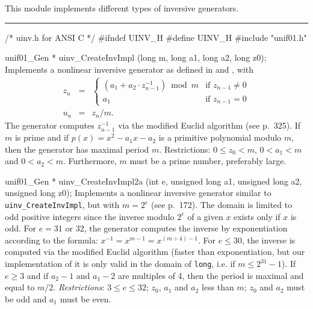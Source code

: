
This module implements different types of inversive generators.

\bigskip
\hrule
\code
\hide
/* uinv.h for ANSI C */
#ifndef UINV_H
#define UINV_H
\endhide
#include "unif01.h"


unif01_Gen * uinv_CreateInvImpl (long m, long a1, long a2, long z0);
\endcode
  \tab Implements a nonlinear inversive generator as 
   defined in \cite{rEIC92c} and \cite[p.93]{rLEC90a}, with
  \begin{eqnarray*}
         z_n &=& \left\{ \begin{array}{ll}
      (a_1 + a_2\cdot z_{n-1}^{-1})\bmod m & \mbox{if $z_{n-1}\not=0$}\\[6pt] 
       a_1                                       & \mbox{if $z_{n-1} = 0$} 
    \end{array} \right.\\
   u_n &=& z_n / m.
  \end{eqnarray*}
   The generator computes $z_{n-1}^{-1}$ via the modified
%
   Euclid algorithm (see \cite{rKNU81a} p.~325).  
   If $m$ is prime and if $p(x) = x^2 - a_1 x - a_2$ is a
   primitive polynomial modulo $m$, then the generator has 
    maximal  period $m$.
   Restrictions: $0 \le z_0 < m$,
   $0 < a_1 < m$ and $0 < a_2 < m$.  Furthermore, $m$ must be a prime
   number, preferably large. %
  \endtab
\code


unif01_Gen * uinv_CreateInvImpl2a (int e, unsigned long a1,
                                   unsigned long a2, unsigned long z0);
\endcode
  \tab Implements a nonlinear inversive generator similar to
    {\tt uinv\_CreateInvImpl}, but with $m = 2^e$ 
   (see \cite{rEIC92c} p.~172). 
   The  domain is limited to odd positive integers since 
   the inverse modulo $2^e$ of a given $x$ exists only if $x$ is odd.
   For $e = 31$ or $32$, the generator computes
   the inverse by exponentiation according to the formula:
   $x^{-1} = x^{m-1} = x^{(m \div 4) - 1}$.  
   For $e \le 30$, the inverse is computed via the modified
   Euclid algorithm (faster than exponentiation,
   but our implementation of it is only valid in the domain
   of {\tt long}, i.e. if $m \le 2^{31}-1$). 
   If $e\ge 3$ and if $a_2-1$ and $a_1-2$ are multiples of 4, 
   then the period is  maximal and equal to $m/2$.
   \emph{Restrictions}:  $3 \le e \le 32$; $z_0$, $a_1$ and $a_2$ less than
   $m$; $z_0$ and $a_2$ must be odd and $a_1$ must be even.
  \endtab
\code


